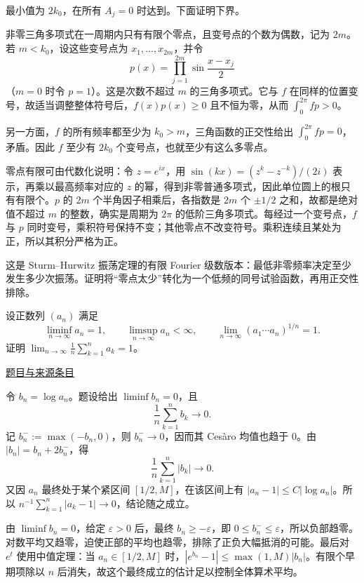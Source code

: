 \documentclass[UTF8,12pt,a4paper,fontset=fandol]{ctexart}
\begin{document}
\begin{solve}\label{ans:fin03-all:3}

最小值为 $2k_0$，在所有 $A_j=0$ 时达到。下面证明下界。

非零三角多项式在一周期内只有有限个零点，且变号点的个数为偶数，记为 $2m$。若 $m<k_0$，设这些变号点为 $x_1,\ldots,x_{2m}$，并令
\[
p(x)=\prod_{j=1}^{2m}\sin\frac{x-x_j}{2}
\]
（$m=0$ 时令 $p=1$）。这是次数不超过 $m$ 的三角多项式。它与 $f$ 在同样的位置变号，故适当调整整体符号后，$f(x)p(x)\ge0$ 且不恒为零，从而 $\int_0^{2\pi}fp>0$。

另一方面，$f$ 的所有频率都至少为 $k_0>m$，三角函数的正交性给出 $\int_0^{2\pi}fp=0$，矛盾。因此 $f$ 至少有 $2k_0$ 个变号点，也就至少有这么多零点。

零点有限可由代数化说明：令 $z=e^{ix}$，用 $\sin(kx)=(z^k-z^{-k})/(2i)$ 表示，再乘以最高频率对应的 $z$ 的幂，得到非零普通多项式，因此单位圆上的根只有有限个。$p$ 的 $2m$ 个半角因子相乘后，各指数是 $2m$ 个 $\pm1/2$ 之和，故都是绝对值不超过 $m$ 的整数，确实是周期为 $2\pi$ 的低阶三角多项式。每经过一个变号点，$f$ 与 $p$ 同时变号，乘积符号保持不变；其他零点不改变符号。乘积连续且某处为正，所以其积分严格为正。

\end{solve}

\begin{remark}[方法与条件]这是 Sturm--Hurwitz 振荡定理的有限 Fourier 级数版本：最低非零频率决定至少发生多少次振荡。证明将“零点太少”转化为一个低频的同号试验函数，再用正交性排除。\end{remark}

\begin{example}[来源序号4]\label{ex:fin03-all:4}\label{pr:fin03-all:4}

设正数列 $(a_n)$ 满足
\[
\liminf_{n\to\infty}a_n=1,\qquad
\limsup_{n\to\infty}a_n<\infty,\qquad
\lim_{n\to\infty}(a_1\cdots a_n)^{1/n}=1.
\]
证明 $\displaystyle\lim_{n\to\infty}\frac1n\sum_{k=1}^n a_k=1$。

\par\href{https://github.com/lzxcr/cmc-mathematics/blob/64916fa1fdbc3e444a652eca204d5669058ee321/src/problems/finals/03/04.md}{题目与来源条目}

\end{example}

\begin{solve}\label{ans:fin03-all:4}

令 $b_n=\log a_n$。题设给出 $\liminf b_n=0$，且
\[
\frac1n\sum_{k=1}^n b_k\longrightarrow0.
\]
记 $b_n^-:=\max(-b_n,0)$，则 $b_n^-\to0$，因而其 Cesàro 均值也趋于 $0$。由 $|b_n|=b_n+2b_n^-$，得
\[
\frac1n\sum_{k=1}^n|b_k|\longrightarrow0.
\]
又因 $a_n$ 最终处于某个紧区间 $[1/2,M]$，在该区间上有
$|a_n-1|\le C|\log a_n|$。所以 $n^{-1}\sum_{k=1}^n|a_k-1|\to0$，结论随之成立。

由 $\liminf b_n=0$，给定 $\varepsilon>0$ 后，最终 $b_n\ge-\varepsilon$，即 $0\le b_n^-\le\varepsilon$，所以负部趋零。对数平均又趋零，迫使正部的平均也趋零，排除了正负大幅抵消的可能。最后对 $e^t$ 使用中值定理：当 $a_n\in[1/2,M]$ 时，$|e^{b_n}-1|\le\max(1,M)|b_n|$。有限个早期项除以 $n$ 后消失，故这个最终成立的估计足以控制全体算术平均。

\end{solve}
\end{document}
